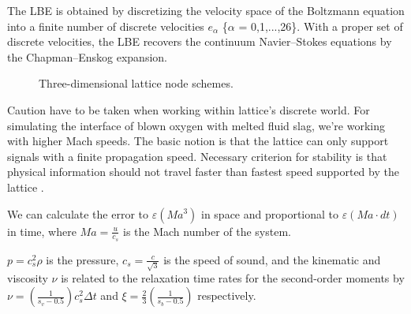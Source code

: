 The LBE is obtained by discretizing the velocity space of the Boltzmann equation into a finite number of discrete velocities $e_\alpha$ \{$\alpha$ = 0,1,...,26\}. With a proper set of discrete velocities, the LBE recovers the continuum Navier–Stokes equations by the Chapman–Enskog expansion.


\begin{figure}[!ht]
	\centering
	\qquad
	\caption{Three-dimensional lattice node schemes.}
	\label{fig:lattice-node-schemes}
\end{figure}


Caution have to be taken when working within lattice's discrete world. For simulating the interface of blown oxygen with melted fluid slag, we're working with higher Mach speeds. The basic notion is that the lattice can only support signals with a finite propagation speed. Necessary criterion for stability is that physical information should not travel faster than fastest speed supported by the lattice \cite{succi2001lattice}.

We can calculate the error to $\varepsilon(Ma^3)$ in space and proportional to $\varepsilon (Ma \cdot dt)$ in time, where $Ma = \frac{u}{c_s}$ is the Mach number of the system.

$p = c_s^2 \rho$ is the pressure, $c_s = \frac{c}{\sqrt{3}}$ is the speed of sound, and the kinematic and viscosity $\nu$ is related to the relaxation time rates for the second-order moments by $\nu = \left(\frac{1}{s_v - 0.5}\right) c_s^2 \Delta t$ and $\xi = \frac{2}{3}\left(\frac{1}{s_b - 0.5}\right)$ respectively.


